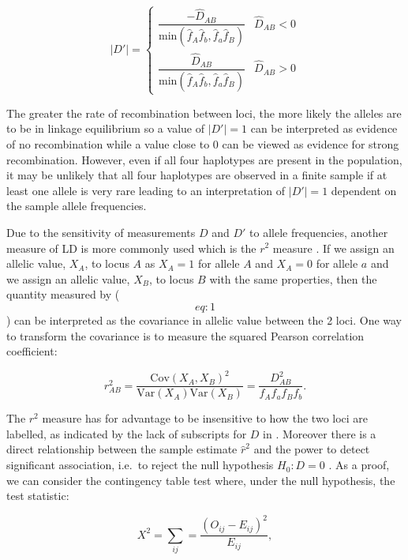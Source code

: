 \documentclass[]{book}
\begin{document}
\[|D'| = \left\{
    \begin{array}{ll}
        \dfrac{-\hat{D}_{AB}}{\text{min}(\hat{f}_A\hat{f}_b,\hat{f}_a\hat{f}_B)} & \hat{D}_{AB} < 0 \\
        \dfrac{\hat{D}_{AB}}{\text{min}(\hat{f}_A\hat{f}_b,\hat{f}_a\hat{f}_B)} & \hat{D}_{AB} > 0
    \end{array}
\right. \nonumber\]

The greater the rate of recombination between loci, the more likely the
alleles are to be in linkage equilibrium so a value of \(|D'| = 1\) can be
interpreted as evidence of no recombination while a value close to 0 can
be viewed as evidence for strong recombination. However, even if all
four haplotypes are present in the population, it may be unlikely that
all four haplotypes are observed in a finite sample if at least one
allele is very rare \citep{devlin_1995_comparison, hill_1974_estimation}
leading to an interpretation of \(|D'| = 1\) dependent on the sample
allele frequencies.

Due to the sensitivity of measurements \(D\) and \(D'\) to allele
frequencies, another measure of LD is more commonly used which is the
\(r^2\) measure \citep{hill_1968_linkage}. If we assign an allelic value,
\(X_A\), to locus \(A\) as \(X_A = 1\) for allele \(A\) and \(X_A = 0\) for allele
\(a\) and we assign an allelic value, \(X_B\), to locus \(B\) with the same
properties, then the quantity measured by (\[eq:1\]) can be interpreted
as the covariance in allelic value between the 2 loci. One way to
transform the covariance is to measure the squared Pearson correlation
coefficient:

\begin{equation}
r^2_{AB} = \dfrac{\text{Cov}(X_A,X_B)^2}{\text{Var}(X_A)\text{Var}(X_B)} = \dfrac{D^2_{AB}}{f_A f_a f_B f_b}.
\label{eq:3}
\end{equation}

The \(r^2\) measure has for advantage to be insensitive to how the two
loci are labelled, as indicated by the lack of subscripts for \(D\) in .
Moreover there is a direct relationship between the sample estimate
\(\hat{r}^2\) and the power to detect significant association, i.e.~to
reject the null hypothesis \(H_0 : D = 0\)
\citep{pritchard2001linkage, chapman2003detecting}. As a proof, we can
consider the contingency table test where, under the null hypothesis,
the test statistic:

\begin{equation}
X^2 = \sum_{ij} = \dfrac{(O_{ij} - E_{ij})^2}{E_{ij}},
\label{eq:4}
\end{equation}
\end{document}
